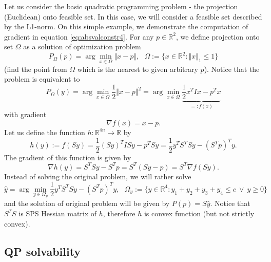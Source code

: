 \begin{example}
Let us consider the basic quadratic programming problem - the projection (Euclidean) onto feasible set. In this case, we will consider a feasible set described by the L1-norm.
On this simple example, we demonstrate the computation of gradient in equation \eqref{eq:absvalconstr4}.
For any $p \in \mathbb{R}^2$, we define projection onto set $\Omega$ as a solution of optimization problem
\begin{displaymath}
 P_{\Omega} (p) = \arg \min\limits_{x \in \Omega} \Vert x - p \Vert, ~~~ \Omega := \lbrace x \in \mathbb{R}^2: \Vert x \Vert_1 \leq 1 \rbrace
\end{displaymath}
(find the point from $\Omega$ which is the nearest to given arbitrary $p$).
Notice that the problem is equivalent to
\begin{displaymath}
 P_{\Omega} (y) = \arg \min\limits_{x \in \Omega} \frac{1}{2}\Vert x - p \Vert^2 = \arg \min\limits_{x \in \Omega} \underbrace{\frac{1}{2} x^T I x - p^T x}_{=: f(x)}
\end{displaymath}
with gradient
\begin{displaymath}
 \nabla f(x) = x - p.
\end{displaymath}
Let us define the function $h: \mathbb{R}^{4n} \rightarrow \mathbb{R}$ by
\begin{displaymath}
 h(y) := f(Sy) = \frac{1}{2} (Sy)^T I Sy - p^T Sy = \frac{1}{2} y^T S^T S y - (S^Tp)^T y.
\end{displaymath}
The gradient of this function is given by
\begin{displaymath}
 \nabla h(y) = S^T S y - S^Tp = S^T ( Sy-p) = S^T \nabla f(Sy).
\end{displaymath}
Instead of solving the original problem, we will rather solve
\begin{displaymath}
 \hat{y} = \arg \min\limits_{y \in \Omega_y} \frac{1}{2} y^T S^T S y - (S^Tp)^T y, ~~~ \Omega_y := \lbrace y \in \mathbb{R}^4: y_1 + y_2 + y_3 + y_4 \leq c ~ \vee ~ y \geq 0 \rbrace
\end{displaymath}
and the solution of original problem will be given by $P(p) = S\hat{y}$. Notice that $S^TS$ is SPS Hessian matrix of $h$, therefore $h$ is convex function (but not strictly convex).
\end{example}

\subsection{QP solvability}


